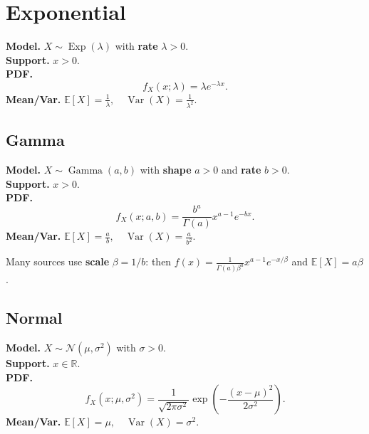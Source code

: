 \documentclass[
  letterpaper,
  DIV=11,
  numbers=noendperiod]{scrreprt}
\theoremstyle{definition}
\theoremstyle{plain}
\theoremstyle{definition}
\theoremstyle{remark}
\begin{document}
\section*{Exponential}\label{sec-exp}


\textbf{Model.} \(X \sim \operatorname{Exp}(\lambda)\) with
\textbf{rate} \(\lambda>0\).\\
\textbf{Support.} \(x>0\).\\
\textbf{PDF.} \[
f_X(x;\lambda)=\lambda e^{-\lambda x}.
\] \textbf{Mean/Var.}
\(\mathbb{E}[X]=\frac{1}{\lambda},\quad \operatorname{Var}(X)=\frac{1}{\lambda^2}.\)

\subsection*{Gamma}\label{sec-gamma}

\textbf{Model.} \(X \sim \operatorname{Gamma}(a,b)\) with \textbf{shape}
\(a>0\) and \textbf{rate} \(b>0\).\\
\textbf{Support.} \(x>0\).\\
\textbf{PDF.} \[
f_X(x;a,b)=\frac{b^a}{\Gamma(a)} x^{a-1} e^{-bx}.
\] \textbf{Mean/Var.}
\(\mathbb{E}[X]=\frac{a}{b},\quad \operatorname{Var}(X)=\frac{a}{b^2}.\)

\begin{tcolorbox}[enhanced jigsaw, left=2mm, toprule=.15mm, breakable, opacityback=0, titlerule=0mm, toptitle=1mm, colbacktitle=quarto-callout-tip-color!10!white, colframe=quarto-callout-tip-color-frame, coltitle=black, rightrule=.15mm, leftrule=.75mm, bottomrule=.15mm, arc=.35mm, bottomtitle=1mm, title=\textcolor{quarto-callout-tip-color}{\faLightbulb}\hspace{0.5em}{Tip}, colback=white, opacitybacktitle=0.6]

Many sources use \textbf{scale} \(\beta=1/b\): then
\(f(x)=\frac{1}{\Gamma(a)\beta^a}x^{a-1}e^{-x/\beta}\) and
\(\mathbb{E}[X]=a\beta\).

\end{tcolorbox}

\subsection*{Normal}\label{sec-normal}

\textbf{Model.} \(X \sim \mathcal{N}(\mu,\sigma^2)\) with
\(\sigma>0\).\\
\textbf{Support.} \(x\in\mathbb{R}\).\\
\textbf{PDF.} \[
f_X(x;\mu,\sigma^2)=\frac{1}{\sqrt{2\pi \sigma^2}}
\exp\!\left(-\frac{(x-\mu)^2}{2\sigma^2}\right).
\] \textbf{Mean/Var.}
\(\mathbb{E}[X]=\mu,\quad \operatorname{Var}(X)=\sigma^2.\)
\end{document}
